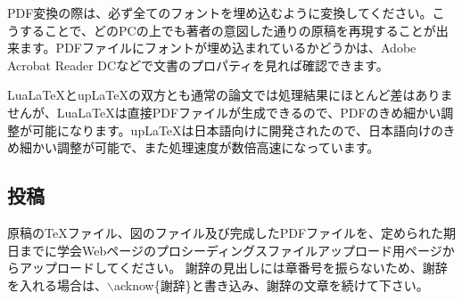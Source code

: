 \documentclass{PASJ2024}
\begin{document}
PDF変換の際は、必ず全てのフォントを埋め込むように変換してください。こうすることで、どのPCの上でも著者の意図した通りの原稿を再現することが出来ます。PDFファイルにフォントが埋め込まれているかどうかは、Adobe Acrobat Reader DCなどで文書のプロパティを見れば確認できます。

{Lua\LaTeX}と{up\LaTeX}の双方とも通常の論文では処理結果にほとんど差はありませんが、{Lua\LaTeX}は直接PDFファイルが生成できるので、PDFのきめ細かい調整が可能になります。{up\LaTeX}は日本語向けに開発されたので、日本語向けのきめ細かい調整が可能で、また処理速度が数倍高速になっています。

% 
\balance %

%
\subsection{投稿}
原稿の{\TeX}ファイル、図のファイル及び完成したPDFファイルを、定められた期日までに学会Webページのプロシーディングスファイルアップロード用ページからアップロードしてください。
%
謝辞の見出しには章番号を振らないため、謝辞を入れる場合は、$\backslash$acknow\{謝辞\}と書き込み、謝辞の文章を続けて下さい。
\end{document}
